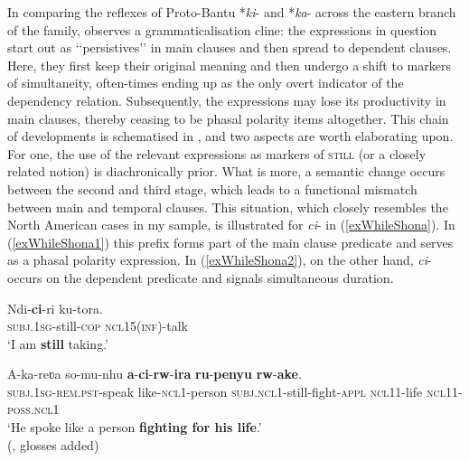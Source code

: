 In comparing the reflexes of Proto-Bantu \mbox{*\textit{ki}-} and \mbox{*\textit{ka}-} across the eastern branch of the family, \textcite{Gueldemann1998} observes a grammaticalisation  cline: the expressions in question start out as \lq\lq persistives\rq\rq{ }in main clauses and then spread to dependent clauses. Here, they first keep their original meaning and then undergo a shift to markers of simultaneity, often-times ending up as the only overt indicator of the dependency relation. Subsequently, the expressions may lose its productivity in main clauses, thereby ceasing to be phasal polarity items altogether. This chain of developments is schematised in , and two aspects are worth elaborating upon. For one, the use of the relevant expressions as markers of \textsc{still} (or a closely related notion) is diachronically prior. What is more, a semantic change occurs between the second and third stage, which leads to a functional mismatch between main and temporal clauses. This situation, which closely resembles the North American cases in my sample, is illustrated for  \mbox{\textit{ci}-} in (\ref{exWhileShona}). In (\ref{exWhileShona1}) this prefix forms part of the main clause predicate and serves as a phasal polarity expression. In (\ref{exWhileShona2}), on the other hand,  \mbox{\textit{ci}-} occurs on the dependent predicate and signals simultaneous duration.\pagebreak

\begin{exe}
	\ex \label{exWhileShona}
	\begin{xlist}
		\exi{}
		\ex\label{exWhileShona1}
		\gll Ndi-\textbf{ci}-ri ku-tora.\\
		\textsc{subj}.1\textsc{sg}-still-\textsc{cop} \textsc{ncl}15(\textsc{inf})-talk\\
		\glt \lq I am \textbf{still} taking.'
		
		\ex\label{exWhileShona2}
		\gll A-ka-reʋa so-mu-nhu \textbf{a}-\textbf{ci}-\textbf{rw}-\textbf{ira} \textbf{ru}-\textbf{penyu} \textbf{rw}-\textbf{ake}.\\
		\textsc{subj}.1\textsc{sg}-\textsc{rem}.\textsc{pst}-speak like-\textsc{ncl}1-person \textsc{subj}.\textsc{ncl}1-still-fight-\textsc{appl} \textsc{ncl}11-life \textsc{ncl}11-\textsc{poss}.\textsc{ncl}1\\
		\glt \lq He spoke like a person \textbf{fighting for his life}.'
		\\(\cite[259, 297]{Fortune1955},  glosses added)
	\end{xlist}
\end{exe}


